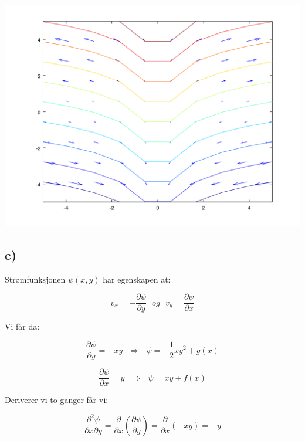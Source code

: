 \documentclass{article}
\begin{document}
\begin{flushle}
\includegraphics[scale=0.6]{images/Problem2b}

%
%

\subsection*{c)}

\begin{flushleft}
Strømfunksjonen \(\psi(x,y)\) har egenskapen at:
\end{flushleft}

\begin{equation*}
v_x = -\frac{\partial\psi}{\partial y} \ \ \ og \ \ \ v_y = \frac{\partial\psi}{\partial x} \end{equation*}

\begin{flushleft}
Vi får da:
\end{flushleft}

\begin{equation*}
\frac{\partial\psi}{\partial y} = -xy \ \ \ \Rightarrow \ \ \ \psi = -\frac{1}{2}xy^2 + g(x)
\end{equation*}

\begin{equation*}
\frac{\partial\psi}{\partial x} = y \ \ \ \Rightarrow \ \ \ \psi = xy + f(x)
\end{equation*}

\begin{flushleft}
Deriverer vi to ganger får vi:
\end{flushleft}

\begin{equation*}
\frac{\partial^2 \psi}{\partial x \partial y} = \frac{\partial}{\partial x}(\frac{\partial \psi}{\partial y}) = \frac{\partial}{\partial x}(-x y) = -y
\end{equation*}


\end{flushle}
\end{document}
